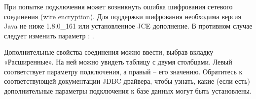 \begin{redremark}
	При попытке подключения может возникнуть ошибка шифрования сетевого соединения (wire encryption). Для поддержки шифрования необходима версия Java не ниже 1.8.0\_161 или установленное JCE дополнение. В противном случае следует изменить параметр : .
\end{redremark}



Дополнительные свойства соединения можно ввести, выбрав вкладку «Расширенные». На ней можно увидеть таблицу с двумя столбцами. Левый соответствует параметру подключения, а правый -- его значению. Обратитесь к соответствующей документации JDBC драйвера, чтобы узнать, какие (если есть) дополнительные параметры подключения к базе данных могут быть установлены.

